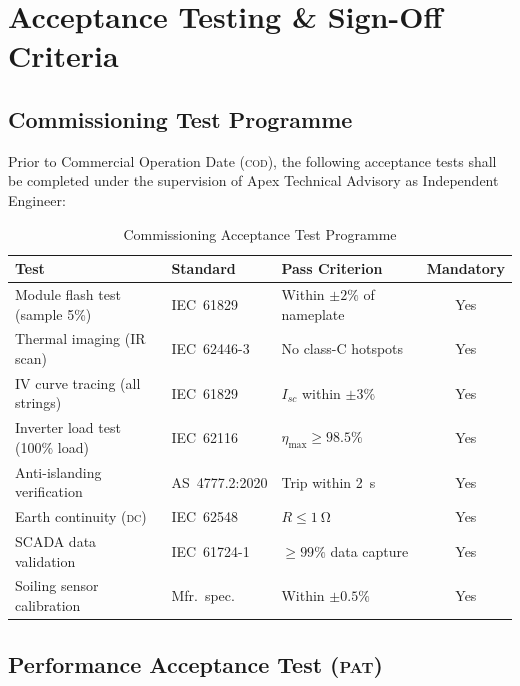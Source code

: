 
\section{Acceptance Testing \& Sign-Off Criteria}

\subsection{Commissioning Test Programme}

Prior to Commercial Operation Date (\textsc{cod}), the following acceptance tests shall be
completed under the supervision of Apex Technical Advisory as Independent Engineer:

\begin{table}[H]
  \centering
  \caption{Commissioning Acceptance Test Programme}
  \label{tab:acceptance}
  \begin{tabular}{@{} l l l c @{}}
    \toprule
    \rowcolor{SolarMist}
    \textbf{Test} & \textbf{Standard} & \textbf{Pass Criterion} & \textbf{Mandatory} \\
    \midrule
    Module flash test (sample 5\%)  & IEC~61829       & Within $\pm2\%$ of nameplate & Yes \\
    Thermal imaging (IR scan)       & IEC~62446-3     & No class-C hotspots          & Yes \\
    IV curve tracing (all strings)  & IEC~61829       & $I_{sc}$ within $\pm3\%$     & Yes \\
    Inverter load test (100\% load) & IEC~62116       & $\eta_{\max} \geq 98.5\%$    & Yes \\
    Anti-islanding verification     & AS~4777.2:2020  & Trip within \SI{2}{\second}  & Yes \\
    Earth continuity (\textsc{dc})  & IEC~62548       & $R \leq \SI{1}{\ohm}$        & Yes \\
    SCADA data validation           & IEC~61724-1     & $\geq 99\%$ data capture      & Yes \\
    Soiling sensor calibration      & Mfr.~spec.      & Within $\pm0.5\%$            & Yes \\
    \bottomrule
  \end{tabular}
\end{table}

\subsection{Performance Acceptance Test (\textsc{pat})}

